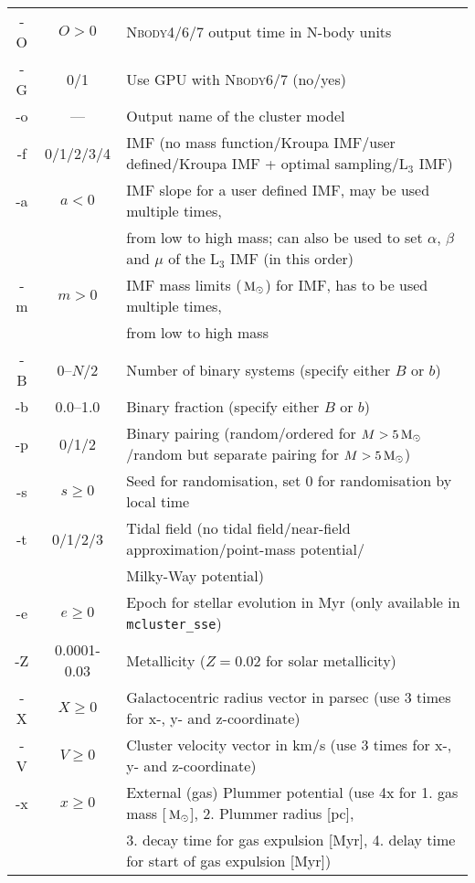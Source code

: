 \documentclass[useAMS,usenatbib]{mn2e}
\newcommand{\msun}{\mbox{$\,{\rm M}_\odot$}}
\begin{document}
\begin{table*}
\begin{minipage}{\textwidth}
{\begin{tabular}{ccl}
      -O & $O>0$ & \textsc{Nbody4/6/7} output time in N-body units\\                           
      -G & 0/1 & Use GPU with \textsc{Nbody6/7} (no/yes)\\                   
      -o & --- & Output name of the cluster model\\                     
      -f & 0/1/2/3/4 & IMF (no mass function/Kroupa IMF/user defined/Kroupa IMF + optimal sampling/L$_3$ IMF)\\
      -a & $a<0$ & IMF slope for a user defined IMF, may be used multiple times,\\
      			&  &  from low to high mass; can also be used to set $\alpha$, $\beta$ and $\mu$ of the L$_3$ IMF (in this order)\\       
     -m & $m>0$ & IMF mass limits ($\msun$) for IMF, has to be used multiple times, \\
     			& & from low to high mass\\
      -B & 0--$N/2$ & Number of binary systems (specify either $B$ or $b$)\\                        
      -b & 0.0--1.0 & Binary fraction (specify either $B$ or $b$)\\           
      -p & 0/1/2 & Binary pairing (random/ordered for $M > 5 \msun$/random but separate pairing for  $M > 5 \msun$)\\  
      -s & $s\ge 0$& Seed for randomisation, set 0 for randomisation by local time\\   
      -t & 0/1/2/3 & Tidal field (no tidal field/near-field approximation/point-mass potential/\\
      			& & Milky-Way potential)\\           
      -e & $e\ge0$ & Epoch for stellar evolution in Myr (only available in \texttt{mcluster\_sse})\\                
      -Z & 0.0001-0.03 & Metallicity ($Z = 0.02$ for solar metallicity)\\          
      -X & $X\ge0$ & Galactocentric radius vector in parsec (use 3 times for x-, y- and z-coordinate)\\       
      -V & $V\ge0$ & Cluster velocity vector in km/s (use 3 times for x-, y- and z-coordinate)\\          
	-x & $x\ge0$ &  External (gas) Plummer potential (use 4x for 1. gas mass [$\msun$], 2. Plummer radius [pc],\\         
         & & 3. decay time for gas expulsion [Myr], 4. delay time for start of gas expulsion [Myr])  \\

\end{tabular}}
\end{minipage}
\end{table*}
\end{document}
